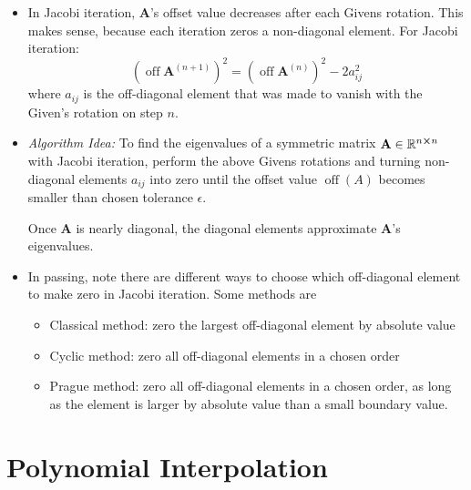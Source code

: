 \documentclass[11pt, a4paper]{article}
\newcommand{\R}{\mathbb{R}} %
\newcommand{\mat}[1]{\mathbf{#1}} %
\begin{document}
\begin{itemize}
	
	\item In Jacobi iteration, $ \mat{A} $'s offset value decreases after each Givens rotation. This makes sense, because each iteration zeros a non-diagonal element. For Jacobi iteration:
	\begin{equation*}
		\left(\operatorname{off}\mat{A}^{(n+1)}\right)^2 = \left(\operatorname{off}\mat{A}^{(n)}\right)^2 - 2a^2_{ij}
	\end{equation*}
	where $ a_{ij} $ is the off-diagonal element that was made to vanish with the Given's rotation on step $ n $.
	
	
	\item \textit{Algorithm Idea:} To find the eigenvalues of a symmetric matrix $ \mat{A} \in \R^{n \cross n} $ with Jacobi iteration, perform the above Givens rotations and turning non-diagonal elements $ a_{ij} $ into zero until the offset value $ \operatorname{off}(A) $ becomes smaller than chosen tolerance $ \epsilon $.
	
	Once $ \mat{A} $ is nearly diagonal, the diagonal elements approximate $ \mat{A} $'s eigenvalues. 
	
	
	\item In passing, note there are different ways to choose which off-diagonal element to make zero in Jacobi iteration. Some methods are
	\begin{itemize}
		\item Classical method: zero the largest off-diagonal element by absolute value
		\item Cyclic method: zero all off-diagonal elements in a chosen order
		\item Prague method: zero all off-diagonal elements in a chosen order, as long as the element is larger by absolute value than a small boundary value.
	\end{itemize}
	
\end{itemize}

\newpage

\section{Polynomial Interpolation}
\end{document}
